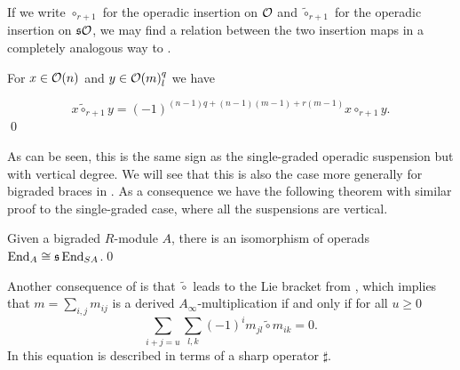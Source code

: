 \documentclass[Thesis.tex]{subfiles}
\begin{document}
If we write $\circ_{r+1}$ for the operadic insertion on ${\mathcal O}$ and $\tilde{\circ}_{r+1}$ for the operadic insertion on $\mathfrak{s}{\mathcal O}$, we may find a relation between the two insertion maps in a completely analogous way to .

\begin{lem}\label{bitildecirc}
For $x\in{\mathcal O}(n)$ and $y\in{\mathcal O}(m)^{q}_l$ we have

\begin{equation}\label{sign}
x\tilde{\circ}_{r+1}y=(-1)^{(n-1)q+(n-1)(m-1)+r(m-1)}x\circ_{r+1} y. 
\end{equation}
\qed
\end{lem}

%
%
%
%
As can be seen, this is the same sign as the single-graded operadic suspension but with vertical degree. We will see that this is also the case more generally for bigraded braces in . As a consequence we have the following theorem with similar proof to the single-graded case, where all the suspensions are vertical.
\begin{thm}
Given a bigraded $R$-module $A$, there is an isomorphism of operads $\operatorname{End}_{ A}\cong \mathfrak{s}\operatorname{End}_{SA}$.\qed
\end{thm}
Another consequence of  is that $\tilde{\circ}$ leads to the Lie bracket from \cite{RW}, which implies that $m=\sum_{i,j}m_{ij}$ is a derived $A_\infty$-multiplication if and only if for all $u\geq 0$
\begin{equation}\label{sharp}
\sum_{i+j=u}\sum_{l,k}(-1)^im_{jl}\tilde{\circ}m_{ik}=0.
\end{equation}
In \cite[Proposition 2.15]{RW} this equation is described in terms of a sharp operator $\sharp$. 
\end{document}
